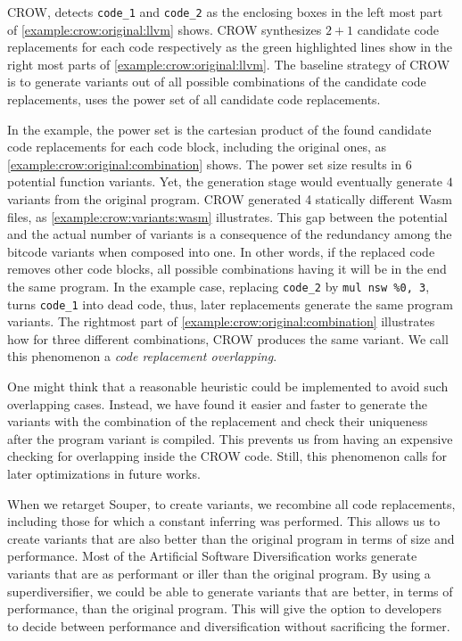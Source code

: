 
    

CROW, detects \texttt{code\_1} and \texttt{code\_2} as the enclosing boxes in the left most part of \autoref{example:crow:original:llvm} shows. CROW synthesizes $2 + 1$ candidate code replacements for each code respectively as the green highlighted lines show in the right most parts of \autoref{example:crow:original:llvm}.
The baseline strategy of CROW is to generate variants out of all possible combinations of the candidate code replacements, \ie uses the power set of all candidate code replacements.

In the example, the power set is the cartesian product of the found candidate code replacements for each code block, including the original ones, as \autoref{example:crow:original:combination} shows. The power set size results in $6$ potential function variants. Yet, the generation stage would eventually generate $4$ variants from the original program. CROW generated 4 statically different Wasm  files, as \autoref{example:crow:variants:wasm} illustrates. This gap between the potential and the actual number of variants is a consequence of the redundancy among the bitcode variants when composed into one. In other words, if the replaced code removes other code blocks, all possible combinations having it will be in the end the same program. In the example case, replacing \texttt{code\_2} by \texttt{mul nsw \%0, 3}, turns \texttt{code\_1} into dead code, thus, later replacements generate the same program variants. The rightmost part of \autoref{example:crow:original:combination} illustrates how for three different combinations, CROW produces the same variant. We call this phenomenon a \emph{code replacement overlapping}.



One might think that a reasonable heuristic could be implemented to avoid such overlapping cases. Instead, we have found it easier and faster to generate the variants with the combination of the replacement and check their uniqueness after the program variant is compiled. This prevents us from having an expensive checking for overlapping inside the CROW code. Still, this phenomenon calls for later optimizations in future works.



When we retarget Souper, to create variants, we recombine all code replacements, including those for which a constant inferring was performed.
This allows us to create variants that are also better than the original program in terms of size and performance. Most of the Artificial Software Diversification  works generate variants that are as performant or iller than the original program. By using a superdiversifier, we could be able to generate variants that are better, in terms of performance, than the original program. This will give the option to developers to decide between performance and diversification without sacrificing the former. 

